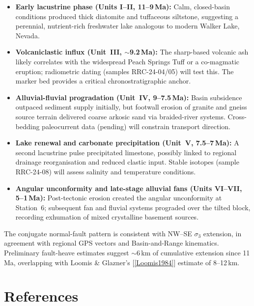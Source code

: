 \documentclass[11pt,a4paper]{article}
\begin{document}
\begin{itemize}
  \item \textbf{Early lacustrine phase (Units I--II, 11--9\,Ma):}
        Calm, closed-basin conditions produced thick diatomite and tuffaceous siltstone,
        suggesting a perennial, nutrient-rich freshwater lake analogous to modern
        Walker Lake, Nevada.
  \item \textbf{Volcaniclastic influx (Unit~III, $\sim$9.2\,Ma):}
        The sharp-based volcanic ash likely correlates with the widespread
        Peach Springs Tuff or a co-magmatic eruption; radiometric dating
        (samples RRC-24-04/05) will test this. The marker bed provides a critical
        chronostratigraphic anchor.
  \item \textbf{Alluvial-fluvial progradation (Unit~IV, 9--7.5\,Ma):}
        Basin subsidence outpaced sediment supply initially, but footwall
        erosion of granite and gneiss source terrain delivered coarse arkosic sand
        via braided-river systems. Cross-bedding paleocurrent data (pending) will
        constrain transport direction.
  \item \textbf{Lake renewal and carbonate precipitation (Unit~V, 7.5--7\,Ma):}
        A second lacustrine pulse precipitated limestone, possibly linked to
        regional drainage reorganisation and reduced clastic input. Stable isotopes
        (sample RRC-24-08) will assess salinity and temperature conditions.
  \item \textbf{Angular unconformity and late-stage alluvial fans (Units VI--VII, 5--1\,Ma):}
        Post-tectonic erosion created the angular unconformity at Station~6;
        subsequent fan and fluvial systems prograded over the tilted block,
        recording exhumation of mixed crystalline basement sources.
\end{itemize}

The conjugate normal-fault pattern is consistent with NW--SE $\sigma_3$ extension,
in agreement with regional GPS vectors and Basin-and-Range kinematics.
Preliminary fault-heave estimates suggest $\sim$6\,km of cumulative extension since 11\,Ma,
overlapping with Loomis \& Glazner's [\ref{Loomis1984}] estimate of 8--12\,km.

\section{References}
\end{document}
